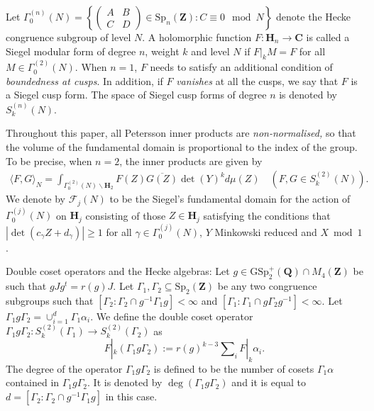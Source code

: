 \documentclass[11pt]{amsart}
\makeatletter
\numberwithin{equation}{section}
\renewcommand\subsubsection{\@secnumfont}{\bfseries}%
\renewcommand\subsubsection{\@startsection{subsubsection}{3}
  \z@{.5\linespacing\@plus.7\linespacing}{-.5em}%
  {\normalfont\bfseries}}
\theoremstyle{plain}
\theoremstyle{definition}
\newcommand{\h}{\mf H}
\newcommand{\mf}{\mathbf}
\newcommand{\mc}{\mathcal}
\newcommand{\mrm}{\mathrm}
\newcommand{\lan}{\langle }
\newcommand{\ran}{\rangle}
\newcommand{\q}{\quad}
\newcommand{\sumn}{\sum \nolimits}
\newcommand{\smat}[4]{\left( \begin{smallmatrix}#1&#2\\#3&#4\end{smallmatrix}\right)}
\newcommand{\spn}{\mrm{Sp}_n(\mf Z)}
\newcommand{\sptwo}{\mrm{Sp}_2( \mf Z)}
\newcommand{\Gn}{\Gamma_0^{(2)}(N)}
\makeatother
\begin{document}
Let $\Gamma_0^{(n)}(N)=\left\{\smat{A}{B}{C}{D}\in \spn : C\equiv 0 \mod N \right\}$ denote the Hecke congruence subgroup of level $N$.  A holomorphic function $F:\h_n \rightarrow \mf C$ is called a Siegel modular form of degree $n$, weight $k$ and level $N$ if $F|_k M= F$ for all $M\in \Gn$. When $n=1$, $F$ needs to satisfy an additional condition of \textit{boundedness at cusps}. In addition, if $F$ \textit{vanishes} at all the cusps, we say that $F$ is a Siegel cusp form. The space of Siegel cusp forms of degree $n$ is denoted by $S_k^{(n)}(N)$.

Throughout this paper, all Petersson inner products are \textit{non-normalised,} so that the volume of the fundamental domain is proportional to the index of the group. To be precise, when $n=2$, the inner products are given by
\begin{align} \label{pet-def}
    \lan F,G \ran_N = \int_{\Gamma_0^{(2)}(N) \backslash \mathbf H_2} F(Z) \overline{G(Z)} \det(Y)^k d \mu(Z) \q (F, G\in S_k^{(2)}(N) ).
\end{align}
We denote by $\mc F_j(N)$ to be the Siegel's fundamental domain for the action of $\Gamma_0^{(j)}(N)$ on $\h_j$ consisting of those $Z \in \h_j$ satisfying the conditions that $|\det(c_\gamma Z + d_\gamma)| \ge 1$ for all $\gamma \in \Gamma_0^{(j)}(N)$, $Y$ Minkowski reduced and $X \bmod 1$.

\subsubsection{Double coset operators and the Hecke algebras:} Let $g\in \mrm{GSp}^+_2(\mf Q)\cap M_4(\mf Z)$ be such that $gJg^t=r(g) J$. Let $\Gamma_1, \Gamma_2\subseteq \sptwo$ be any two congruence subgroups such that $[\Gamma_2:\Gamma_2\cap g^{-1} \Gamma_1 g]<\infty$ and $[\Gamma_1:\Gamma_1\cap g \Gamma_2 g^{-1}]<\infty$. Let $\Gamma_1 g \Gamma_2 = \cup_{i=1}^{d} \Gamma_1 \alpha_i $. We define the double coset operator $\Gamma_1 g \Gamma_2: S_k^{(2)}(\Gamma_1)\longrightarrow S_k^{(2)}(\Gamma_2)$ as
\begin{equation}
    F|_k (\Gamma_1 g\Gamma_2) := r(g)^{k-3} \sumn_i F|_k\alpha_i.
\end{equation}
The degree of the operator $\Gamma_1 g\Gamma_2$ is defined to be the number of cosets $\Gamma_1\alpha$ contained in $\Gamma_1 g\Gamma_2$. It is denoted by $\deg(\Gamma_1 g\Gamma_2)$ and it is equal to $d=[\Gamma_2:\Gamma_2\cap g^{-1} \Gamma_1 g]$ in this case.
\end{document}
